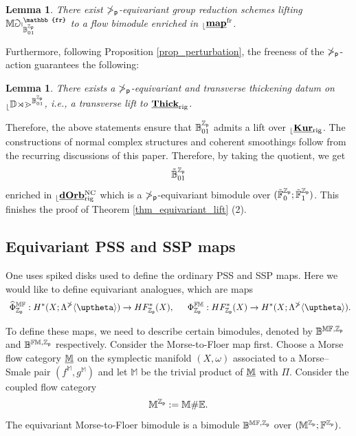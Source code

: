 \documentclass[reqno, 10pt]{amsart}
\numberwithin{equation}{section}
\numberwithin{equation}{section}
\newtheorem{lemma}[thm]{Lemma}
\theoremstyle{definition}
\theoremstyle{remark}
\newcommand{\beqn}{\begin{equation*}}
\newcommand{\eeqn}{\end{equation*}}
\newcommand{\mb}{\mathbb}
\newcommand{\p}{{\sf p}}
\newcommand{\zp}{{{\mb Z}_{\sf p}}}
\newcommand{\ep}{{{\mathbb E}}}
\renewcommand{\outer}{{}_{\lfloor}}
\newcommand{\wh}{\widehat}
\newcommand{\uds}[1]{\underline{\smash{#1}}}
\begin{document}
\begin{lemma}
    There exist $\mb\Pi_\p$-equivariant group reduction schemes lifting $\mb{Map}_{\mb{B}^{\zp}_{01}}^{\mb{fr}}$ to a flow bimodule enriched in $\outer \uds{{\bf map}}{}^{\rm fr} $.
\end{lemma}

Furthermore, following Proposition \ref{prop_perturbation}, the freeness of the $\mb\Pi_\p$-action guarantees the following:

\begin{lemma}
    There exists a $\mb\Pi_\p$-equivariant and transverse thickening datum on $\outer \mb{Dom}^{{\mb B}_{01}^{\zp}}$, i.e., a transverse lift to $\uds{\bf Thick}_{\rm rig}$.
\end{lemma}

Therefore, the above statements ensure that $\mb{B}_{01}^\zp$ admits a lift over $\outer \uds{\bf Kur}{}_{\rm rig}$. The constructions of normal complex structures and coherent smoothings follow from the recurring discussions of this paper. Therefore, by taking the quotient, we get
\beqn
\tilde{\mb{B}}_{01}^\zp
\eeqn
enriched in $\outer \uds{\bf dOrb}^{\rm NC}_{\rm rig}$ which is a $\mb\Pi_\p$-equivariant bimodule over $(\tilde {\mb F}_0^{\zp}; \tilde {\mb F}_1^{\zp})$. This finishes the proof of Theorem \ref{thm_equivariant_lift} (2).












\subsection{Equivariant PSS and SSP maps}

One uses spiked disks used to define the ordinary PSS and SSP maps. Here we would like to define equivariant analogues, which are maps
\begin{align*}
&\ \wh\Phi_{\zp}^{\mb{MF}}: H^*(X; \Lambda^{{\mb\Pi}}\langle \uptheta \rangle) \to HF_\zp^*(X),\ &\ \Phi_{\zp}^{\mb{FM}}: HF_{\zp}^*(X) \to H^*(X; \Lambda^{{\mb\Pi}} \langle \uptheta \rangle).
\end{align*}

To define these maps, we need to describe certain bimodules, denoted by $\mb{B}^{\mb{MF}, \zp}$ and $\mb{B}^{\mb{FM}, \zp}$ respectively. Consider the Morse-to-Floer map first. Choose a Morse flow category $\uds{\mb M}$ on the symplectic manifold $(X, \omega)$ associated to a Morse--Smale pair $(f^{\mb M}, g^{\mb M})$ and let ${\mb M}$ be the trivial product of $\uds{\mb M}$ with $\Pi$. Consider the coupled flow category 
\beqn
{\mb M}^\zp:=\mb{M} \# \ep.
\eeqn
The equivariant Morse-to-Floer bimodule is a bimodule $\mb{B}^{\mb{MF}, \zp}$ over $(\mb{M}^\zp; \mb{F}^\zp)$. 
\end{document}
